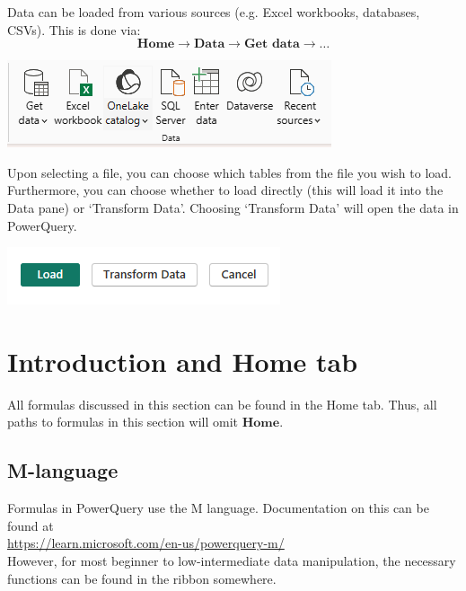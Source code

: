 \documentclass[10pt, openany, twocolumn]{book}
\begin{document}
Data can be loaded from various sources (e.g. Excel workbooks, databases, CSVs). This is done via:
$$\textbf{Home} \rightarrow \textbf{Data} \rightarrow \textbf{Get data} \rightarrow \ldots $$

\begin{center}
    \includegraphics[width = 0.9\columnwidth]{images/get_data.png}
\end{center}
Upon selecting a file, you can choose which tables from the file you wish to load. Furthermore, you can choose whether to load directly (this will load it into the Data pane) or `Transform Data'. Choosing `Transform Data' will open the data in PowerQuery.
\begin{center}
    \includegraphics[width = 0.75\columnwidth]{images/get_data_options.png}
\end{center}

\section{Introduction and Home tab}

All formulas discussed in this section can be found in the Home tab. Thus, all paths to formulas in this section will omit $\textbf{Home}$.
\subsection*{M-language}

Formulas in PowerQuery use the M language. Documentation on this can be found at\\

\href{https://learn.microsoft.com/en-us/powerquery-m/}{https://learn.microsoft.com/en-us/powerquery-m/}\\

However, for most beginner to low-intermediate data manipulation, the necessary functions can be found in the ribbon somewhere.
\end{document}
